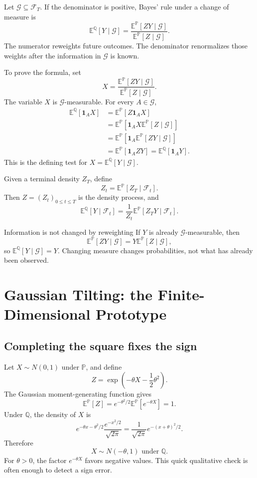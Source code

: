 \documentclass[10pt]{article}
\newcommand{\E}{\mathbb E}
\newcommand{\Pp}{\mathbb P}
\newcommand{\Q}{\mathbb Q}
\newcommand{\1}{\mathbf 1}
\newcommand{\cF}{\mathcal F}
\theoremstyle{definition}
\begin{document}
Let \(\mathcal G\subseteq\cF_T\). If the denominator is positive, Bayes'
rule under a change of measure is
\[
\boxed{
\E^{\Q}[Y\mid\mathcal G]
=\frac{\E^{\Pp}[ZY\mid\mathcal G]}
       {\E^{\Pp}[Z\mid\mathcal G]}.}
\]
The numerator reweights future outcomes. The denominator renormalizes those
weights after the information in \(\mathcal G\) is known.

To prove the formula, set
\[
X=\frac{\E^{\Pp}[ZY\mid\mathcal G]}
        {\E^{\Pp}[Z\mid\mathcal G]}.
\]
The variable \(X\) is \(\mathcal G\)-measurable. For every
\(A\in\mathcal G\),
\[
\begin{aligned}
\E^{\Q}[\1_AX]
&=\E^{\Pp}[Z\1_AX]\\
&=\E^{\Pp}[\1_AX\E^{\Pp}[Z\mid\mathcal G]]\\
&=\E^{\Pp}[\1_A\E^{\Pp}[ZY\mid\mathcal G]]\\
&=\E^{\Pp}[\1_AZY]
=\E^{\Q}[\1_AY].
\end{aligned}
\]
This is the defining test for \(X=\E^{\Q}[Y\mid\mathcal G]\).

Given a terminal density \(Z_T\), define
\[
\boxed{Z_t=\E^{\Pp}[Z_T\mid\cF_t].}
\]
Then \(Z=(Z_t)_{0\leq t\leq T}\) is the density process, and
\[
\boxed{
\E^{\Q}[Y\mid\cF_t]
=\frac1{Z_t}\E^{\Pp}[Z_TY\mid\cF_t].}
\]

\begin{keyidea}{Information is not changed by reweighting}
If \(Y\) is already \(\mathcal G\)-measurable, then
\[
\E^{\Pp}[ZY\mid\mathcal G]
=Y\E^{\Pp}[Z\mid\mathcal G],
\]
so \(\E^{\Q}[Y\mid\mathcal G]=Y\). Changing measure changes probabilities,
not what has already been observed.
\end{keyidea}

\section{Gaussian Tilting: the Finite-Dimensional Prototype}

\subsection{Completing the square fixes the sign}

Let \(X\sim N(0,1)\) under \(\Pp\), and define
\[
Z=\exp\!\left(-\theta X-\frac12\theta^2\right).
\]
The Gaussian moment-generating function gives
\[
\E^{\Pp}[Z]
=e^{-\theta^2/2}\E^{\Pp}[e^{-\theta X}]=1.
\]
Under \(\Q\), the density of \(X\) is
\[
e^{-\theta x-\theta^2/2}\frac{e^{-x^2/2}}{\sqrt{2\pi}}
=\frac1{\sqrt{2\pi}}e^{-(x+\theta)^2/2}.
\]
Therefore
\[
\boxed{X\sim N(-\theta,1)\text{ under }\Q.}
\]
For \(\theta>0\), the factor \(e^{-\theta X}\) favors negative values. This
quick qualitative check is often enough to detect a sign error.
\end{document}
